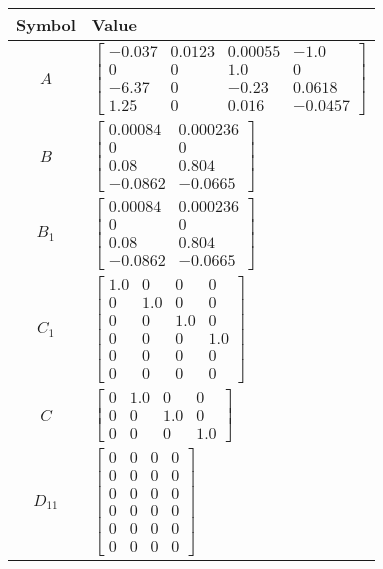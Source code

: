 \begin{tabular}{cl}
\hline
  Symbol  & Value                                                                                                                                              \\
\hline
   $A$    & $\left[\begin{matrix}-0.037 & 0.0123 & 0.00055 & -1.0\\0 & 0 & 1.0 & 0\\-6.37 & 0 & -0.23 & 0.0618\\1.25 & 0 & 0.016 & -0.0457\end{matrix}\right]$ \\
   $B$    & $\left[\begin{matrix}0.00084 & 0.000236\\0 & 0\\0.08 & 0.804\\-0.0862 & -0.0665\end{matrix}\right]$                                                \\
 $B_{1}$  & $\left[\begin{matrix}0.00084 & 0.000236\\0 & 0\\0.08 & 0.804\\-0.0862 & -0.0665\end{matrix}\right]$                                                \\
 $C_{1}$  & $\left[\begin{matrix}1.0 & 0 & 0 & 0\\0 & 1.0 & 0 & 0\\0 & 0 & 1.0 & 0\\0 & 0 & 0 & 1.0\\0 & 0 & 0 & 0\\0 & 0 & 0 & 0\end{matrix}\right]$          \\
   $C$    & $\left[\begin{matrix}0 & 1.0 & 0 & 0\\0 & 0 & 1.0 & 0\\0 & 0 & 0 & 1.0\end{matrix}\right]$                                                         \\
 $D_{11}$ & $\left[\begin{matrix}0 & 0 & 0 & 0\\0 & 0 & 0 & 0\\0 & 0 & 0 & 0\\0 & 0 & 0 & 0\\0 & 0 & 0 & 0\\0 & 0 & 0 & 0\end{matrix}\right]$                  \\

\end{tabular}
